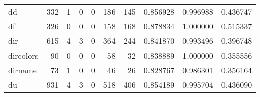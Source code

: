 \begin{longtable}{lrrrrrrrrr}
dd        &                                   332 &                                                  1 &                                                  0 &                                                  0 &                                                186 &                                                145 &                                           0.856928 &                               0.996988 &                             0.436747 \\
df        &                                   326 &                                                  0 &                                                  0 &                                                  0 &                                                158 &                                                168 &                                           0.878834 &                               1.000000 &                             0.515337 \\
dir       &                                   615 &                                                  4 &                                                  3 &                                                  0 &                                                364 &                                                244 &                                           0.841870 &                               0.993496 &                             0.396748 \\
dircolors &                                    90 &                                                  0 &                                                  0 &                                                  0 &                                                 58 &                                                 32 &                                           0.838889 &                               1.000000 &                             0.355556 \\
dirname   &                                    73 &                                                  1 &                                                  0 &                                                  0 &                                                 46 &                                                 26 &                                           0.828767 &                               0.986301 &                             0.356164 \\
du        &                                   931 &                                                  4 &                                                  3 &                                                  0 &                                                518 &                                                406 &                                           0.854189 &                               0.995704 &                             0.436090 \\

\end{longtable}
